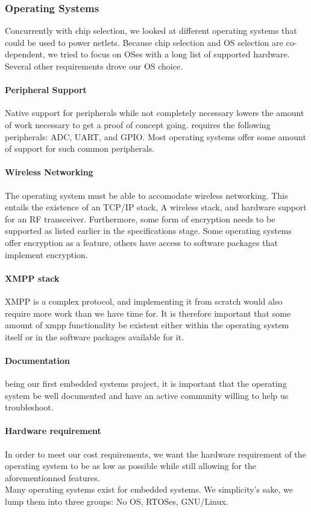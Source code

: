 \subsubsection{Operating Systems}
Concurrently with chip selection, we looked at different operating systems that could be used to power netlets. Because chip selection and OS selection are co-dependent, we tried to focus on OSes with a long list of supported hardware. Several other requirements drove our OS choice.

\paragraph{Peripheral Support} Native support for peripherals while not completely necessary lowers the amount of work necessary to get a proof of concept going. \netlet requires the following peripherals: ADC, UART, and GPIO. Most operating systems offer some amount of support for such common peripherals.

\paragraph{Wireless Networking} The operating system must be able to accomodate wireless networking. This entails the existence of an TCP/IP stack, A wireless stack, and hardware support for an RF transceiver. Furthermore, some form of encryption needs to be supported as listed earlier in the specifications stage. Some operating systems offer encryption as a feature, others have access to software packages that implement encryption.

\paragraph{XMPP stack} XMPP is a complex protocol, and implementing it from scratch would also require more work than we have time for. It is therefore important that some amount of xmpp functionality be existent either within the operating system itself or in the software packages available for it.

\paragraph{Documentation} \netlet being our first embedded systems project, it is important that the operating system be well documented and have an active community willing to help us troubleshoot.

\paragraph{Hardware requirement} In order to meet our cost requirements, we want the hardware requirement of the operating system to be as low as possible while still allowing for the aforementionned features.
\newline
\\
Many operating systems exist for embedded systems. We simplicity's sake, we lump them into three groups: No OS, RTOSes, GNU/Linux.\\

